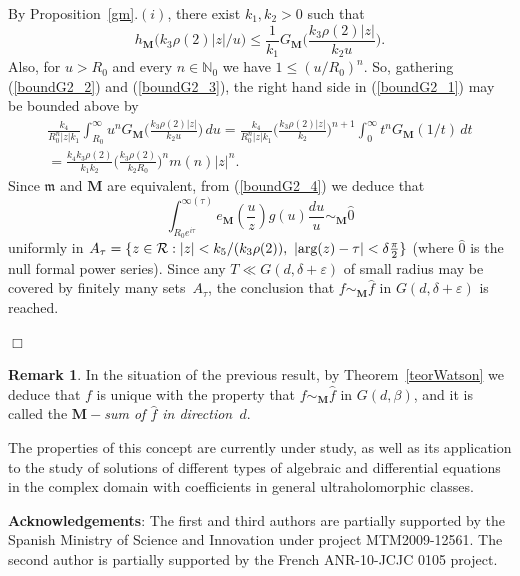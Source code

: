 \documentclass[11pt,a4paper,leqno]{article}
\theoremstyle{plain}
\theoremstyle{definition}
\newtheorem{rem}[theo]{Remark}
\newenvironment{proof1}{\medskip\par\noindent{\bf Proof}}{\hfill $\Box$
\medskip\par}
\def\N{\mathbb{N}}
\def\bM{\boldsymbol{M}}
\begin{document}
\begin{proof1}
By Proposition~\ref{gm}.$(i)$, there exist $k_1,k_2>0$ such that
\begin{equation}\label{boundG2_3}
h_{\bM}\big(k_3\rho(2)|z|/u\big)\le
\frac{1}{k_1}G_{\bM}\Big(\frac{k_3\rho(2)|z|}{k_2u}\Big).
\end{equation}
Also, for $u>R_0$ and every $n\in\N_0$ we have $1\le (u/R_0)^n$.
So, gathering (\ref{boundG2_2}) and (\ref{boundG2_3}), the right hand side in (\ref{boundG2_1}) may be bounded above by
\begin{multline}\label{boundG2_4}
\frac{k_4}{R_0^n|z|k_1}\int_{R_0}^{\infty}u^n G_{\bM}\Big(\frac{k_3\rho(2)|z|}{k_2u}\Big)\,du
=\frac{k_4}{R_0^n|z|k_1}\Big(\frac{k_3\rho(2)|z|}{k_2}\Big)^{n+1} \int_{0}^{\infty}t^nG_{\bM}(1/t)\,dt\\
=\frac{k_4k_3\rho(2)}{k_1k_2}\Big(\frac{k_3\rho(2)}{k_2R_0}\Big)^{n}m(n)|z|^n.
\end{multline}
Since $\mathfrak{m}$ and $\bM$ are equivalent, from (\ref{boundG2_4}) we deduce that
$$
\int_{R_0e^{i\tau}}^{\infty(\tau)} e_{\bM}\left(\frac{u}{z}\right)g(u)\frac{du}{u}\sim_{\bM}\hat{0}
$$
uniformly in $A_\tau=\{z\in\mathcal{R}: |z|<k_5/(k_3\rho(2)),\ |\hbox{arg}(z)-\tau|<\delta\frac{\pi}{2}\}$ (where $\hat{0}$ is the null formal power series).
Since any $T\ll G(d,\delta+\varepsilon)$ of small radius may be covered by finitely many 
sets~$A_\tau$, the conclusion that $f\sim_{\bM}\hat{f}$ in $G(d,\delta+\varepsilon)$ is reached.

\end{proof1}
\begin{rem}
In the situation of the previous result, by Theorem~\ref{teorWatson} we deduce that $f$ is unique with the property  that $f\sim_{\bM}\hat{f}$ in $G(d,\beta)$, and it is called the \textit{$\bM-$sum of $\hat{f}$ in direction~$d$}.\par
The properties of this concept are currently under study, as well as its application to the study of solutions of different types of algebraic and differential equations in the complex domain with coefficients in general ultraholomorphic classes.
\end{rem}


\noindent\textbf{Acknowledgements}: The first and third authors are partially supported by the Spanish Ministry of Science and Innovation under project MTM2009-12561.
The second author is partially supported by the French ANR-10-JCJC 0105 project.
\end{document}
